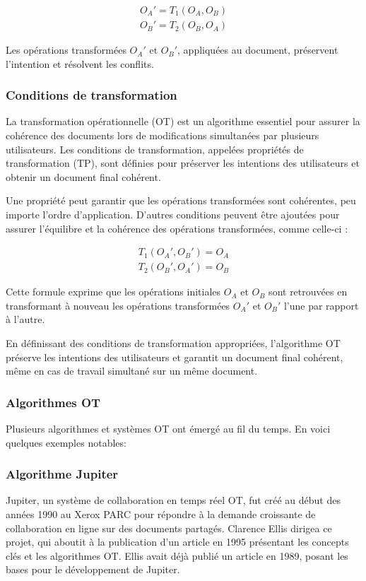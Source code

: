 \begin{equation}
    \begin{aligned}
        O_A' = T_1(O_A, O_B) \\
        O_B' = T_2(O_B, O_A)
    \end{aligned}
\end{equation}

Les opérations transformées $O_A'$ et $O_B'$, appliquées au document, préservent l'intention et résolvent les conflits.

\subsubsection{Conditions de transformation}
La transformation opérationnelle (OT) est un algorithme essentiel pour assurer la cohérence des documents lors de modifications simultanées par plusieurs utilisateurs. Les conditions de transformation, appelées propriétés de transformation (TP), sont définies pour préserver les intentions des utilisateurs et obtenir un document final cohérent.

Une propriété peut garantir que les opérations transformées sont cohérentes, peu importe l'ordre d'application. D'autres conditions peuvent être ajoutées pour assurer l'équilibre et la cohérence des opérations transformées, comme celle-ci :

\begin{equation}
    \begin{aligned}
        T_1(O_A', O_B') = O_A \\
        T_2(O_B', O_A') = O_B
    \end{aligned}
\end{equation}

Cette formule exprime que les opérations initiales $O_A$ et $O_B$ sont retrouvées en transformant à nouveau les opérations transformées $O_A'$ et $O_B'$ l'une par rapport à l'autre.

En définissant des conditions de transformation appropriées, l'algorithme OT préserve les intentions des utilisateurs et garantit un document final cohérent, même en cas de travail simultané sur un même document.
\subsubsection{Algorithmes OT}
Plusieurs algorithmes et systèmes OT ont émergé au fil du temps. En voici quelques exemples notables:

\subsubsection{Algorithme Jupiter}
Jupiter, un système de collaboration en temps réel OT, fut créé au début des années 1990 au Xerox PARC pour répondre à la demande croissante de collaboration en ligne sur des documents partagés. Clarence Ellis dirigea ce projet, qui aboutit à la publication d'un article en 1995 présentant les concepts clés et les algorithmes OT. Ellis avait déjà publié un article en 1989, posant les bases pour le développement de Jupiter.

